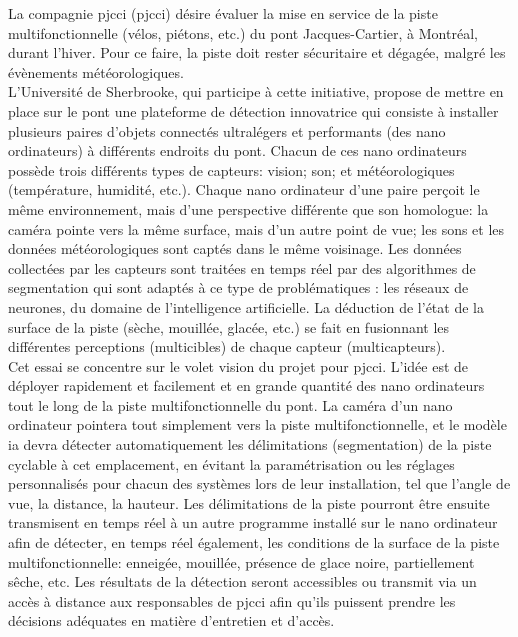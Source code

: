 ﻿\noindent La compagnie \acrlong{pjcci} (\acrshort{pjcci}) désire évaluer la mise en service de la piste multifonctionnelle (vélos, piétons, etc.) du pont Jacques-Cartier, à Montréal, durant l'hiver. Pour ce faire, la piste doit rester sécuritaire et dégagée, malgré les évènements météorologiques.
\vspace{\baselineskip}
\\
\noindent L'Université de Sherbrooke, qui participe à cette initiative, propose de mettre en place sur le pont une plateforme de détection innovatrice qui consiste à installer plusieurs paires d'objets connectés ultralégers et performants (des nano ordinateurs) à différents endroits du pont. Chacun de ces nano ordinateurs possède trois différents types de capteurs: vision; son; et météorologiques (température, humidité, etc.). Chaque nano ordinateur d'une paire perçoit le même environnement, mais d'une perspective différente que son homologue: la caméra pointe vers la même surface, mais d'un autre point de vue; les sons et les données météorologiques sont captés dans le même voisinage. Les données collectées par les capteurs sont traitées en temps réel par des algorithmes de segmentation qui sont adaptés à ce type de problématiques : les réseaux de neurones, du domaine de l'intelligence artificielle. La déduction de l'état de la surface de la piste (sèche, mouillée, glacée, etc.) se fait en fusionnant les différentes perceptions (multicibles) de chaque capteur (multicapteurs).
\vspace{\baselineskip}
\\
\noindent Cet essai se concentre sur le volet vision du projet pour \acrshort{pjcci}. L'idée est de déployer rapidement et facilement et en grande quantité  des nano ordinateurs tout le long de la piste multifonctionnelle du pont. La caméra d'un nano ordinateur pointera tout simplement vers la piste multifonctionnelle, et le modèle \acrshort{ia} devra détecter automatiquement les délimitations (segmentation) de la piste cyclable à cet emplacement, en évitant la paramétrisation ou les réglages personnalisés pour chacun des systèmes lors de leur installation, tel que l'angle de vue, la distance, la hauteur. Les délimitations de la piste pourront être ensuite transmisent en temps réel à un autre programme installé sur le nano ordinateur afin de détecter, en temps réel également, les conditions de la surface de la piste multifonctionnelle: enneigée, mouillée, présence de glace noire, partiellement sêche, etc. Les résultats de la détection seront accessibles ou transmit via un accès à distance aux responsables de \acrshort{pjcci} afin qu'ils puissent prendre les décisions adéquates en matière d'entretien et d'accès. 
